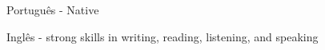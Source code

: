 
\begin{cventries}
  \cventry
  {}
  {
    \begin{cvitems} %
      \item {Português - Native}
      \item {Inglês - strong skills in writing, reading, listening, and speaking}
    \end{cvitems}
  }
  {} {} {}

\end{cventries}